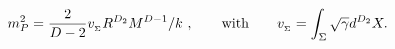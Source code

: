 \begin{equation}
    \label{planckmass}
    m_P^2 = {2\over D-2} v_{{}_\Sigma}  R^{D_2} M^{D-1}/k ~,
    \qquad {\rm with}\qquad
    v_{{}_\Sigma}=\int_\Sigma \sqrt{\gamma} d^{D_2} X.
\end{equation}


